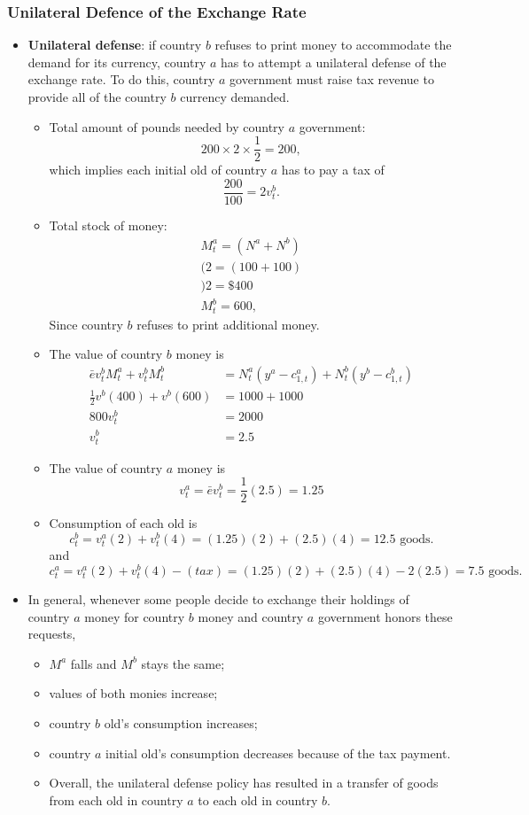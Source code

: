 \documentclass[a4paper,twoside]{article}
\newif\IfInSansMode
\numberwithin{equation}{section}
\numberwithin{figure}{section}
\begin{document}
\subsubsection{Unilateral Defence of the Exchange Rate}
	\begin{itemize}
		\item \textbf{Unilateral defense}: if country \( b \) refuses to print money to accommodate the demand for its currency, country \( a \) has to attempt a unilateral defense of the exchange rate. To do this, country \( a \) government must raise tax revenue to provide all of the country \( b \) currency demanded.
		\begin{itemize}
			\item Total amount of pounds needed by country \( a \) government:
			\[
				200 \times 2 \times \frac{1}{2} = 200,
			\]
			which implies each initial old of country \( a \) has to pay a tax of
			\[
				\frac{200}{100} = 2v_t^b.
			\]
			\item Total stock of money:
			\begin{gather*}
				M_t^a = (N^a+N^b)\\(2 = (100+100)\\)2 = \$400\\
				M_t^b = 600,
			\end{gather*}
			Since country \( b \) refuses to print additional money.
			\item The value of country \( b \) money is
			\begin{align*}
				\bar{e}v_t^b M_t^a + v_t^b M_t^b &= N_t^a \left(y^a - c_{1,t}^a\right) + N_t^b \left(y^b - c_{1,t}^b\right)\\
				\frac{1}{2}v^b(400) +v^b(600) &= 1000 + 1000\\
				800 v_t^b &= 2000\\
				v_t^b &= 2.5
			\end{align*}
			\item The value of country \( a \) money is
			\[
			v_t^a = \bar{e}v_t^b = \frac{1}{2}(2.5) = 1.25
			\]
			\item Consumption of each old is
				\[ 
					c_t^b = v_t^a(2) + v_t^b(4) = (1.25)(2) + (2.5)(4) = 12.5 \text{ goods.}
				\]
			and
				\[ 
					c_t^a = v_t^a(2) + v_t^b(4)- (tax) = (1.25)(2) + (2.5)(4) - 2(2.5)= 7.5 \text{ goods.}
				\]
		\end{itemize}
		\item In general, whenever some people decide to exchange their holdings of country \( a \) money for country \( b \) money and country \( a \) government honors these requests,
		\begin{itemize}
			\item \( M^a \) falls and \( M^b \) stays the same;
			\item values of both monies increase;
			\item country \( b \) old's consumption increases;
			\item country \( a \) initial old's consumption decreases because of the tax payment.
			\item Overall, the unilateral defense policy has resulted in a transfer of goods from each old in country \( a \) to each old in country \( b \).
		\end{itemize}
	\end{itemize}
\end{document}
